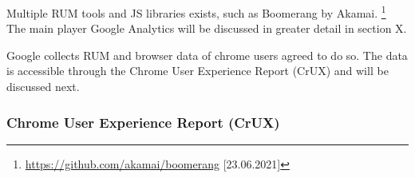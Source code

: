 
Multiple RUM tools and JS libraries exists, such as Boomerang by Akamai. \footnote{\url{https://github.com/akamai/boomerang} [23.06.2021]}
The main player Google Analytics will be discussed in greater detail in section X.




Google collects RUM and browser data of chrome users agreed to do so.
The data is accessible through the Chrome User Experience Report (CrUX) and will be discussed next.















\subsubsection{Chrome User Experience Report (CrUX)}



